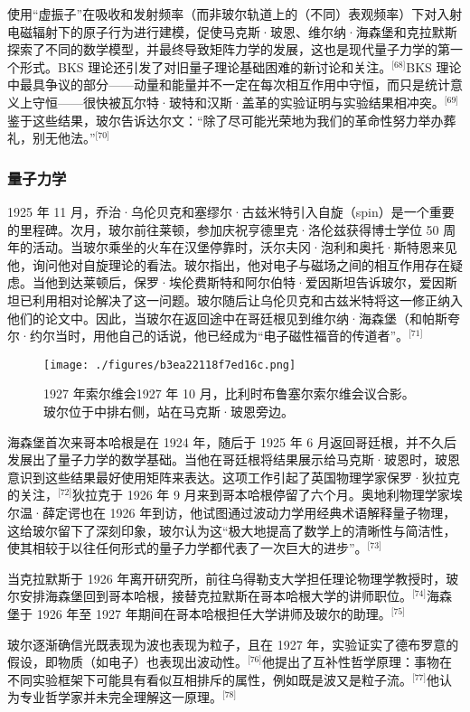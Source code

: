 使用“虚振子”在吸收和发射频率（而非玻尔轨道上的（不同）表观频率）下对入射电磁辐射下的原子行为进行建模，促使马克斯·玻恩、维尔纳·海森堡和克拉默斯探索了不同的数学模型，并最终导致矩阵力学的发展，这也是现代量子力学的第一个形式。BKS 理论还引发了对旧量子理论基础困难的新讨论和关注。\(^\text{[68]}\)BKS 理论中最具争议的部分——动量和能量并不一定在每次相互作用中守恒，而只是统计意义上守恒——很快被瓦尔特·玻特和汉斯·盖革的实验证明与实验结果相冲突。\(^\text{[69]}\)鉴于这些结果，玻尔告诉达尔文：“除了尽可能光荣地为我们的革命性努力举办葬礼，别无他法。”\(^\text{[70]}\)
\subsubsection{量子力学}
1925 年 11 月，乔治·乌伦贝克和塞缪尔·古兹米特引入自旋（spin）是一个重要的里程碑。次月，玻尔前往莱顿，参加庆祝亨德里克·洛伦兹获得博士学位 50 周年的活动。当玻尔乘坐的火车在汉堡停靠时，沃尔夫冈·泡利和奥托·斯特恩来见他，询问他对自旋理论的看法。玻尔指出，他对电子与磁场之间的相互作用存在疑虑。当他到达莱顿后，保罗·埃伦费斯特和阿尔伯特·爱因斯坦告诉玻尔，爱因斯坦已利用相对论解决了这一问题。玻尔随后让乌伦贝克和古兹米特将这一修正纳入他们的论文中。因此，当玻尔在返回途中在哥廷根见到维尔纳·海森堡（和帕斯夸尔·约尔当时，用他自己的话说，他已经成为“电子磁性福音的传道者”。\(^\text{[71]}\)
\begin{figure}[ht]
\centering
\texttt{[image: ./figures/b3ea22118f7ed16c.png]}
\caption{1927 年索尔维会1927 年 10 月，比利时布鲁塞尔索尔维会议合影。玻尔位于中排右侧，站在马克斯·玻恩旁边。} \label{fig_NRSbr_7}
\end{figure}
海森堡首次来哥本哈根是在 1924 年，随后于 1925 年 6 月返回哥廷根，并不久后发展出了量子力学的数学基础。当他在哥廷根将结果展示给马克斯·玻恩时，玻恩意识到这些结果最好使用矩阵来表达。这项工作引起了英国物理学家保罗·狄拉克的关注，\(^\text{[72]}\)狄拉克于 1926 年 9 月来到哥本哈根停留了六个月。奥地利物理学家埃尔温·薛定谔也在 1926 年到访，他试图通过波动力学用经典术语解释量子物理，这给玻尔留下了深刻印象，玻尔认为这“极大地提高了数学上的清晰性与简洁性，使其相较于以往任何形式的量子力学都代表了一次巨大的进步”。\(^\text{[73]}\)

当克拉默斯于 1926 年离开研究所，前往乌得勒支大学担任理论物理学教授时，玻尔安排海森堡回到哥本哈根，接替克拉默斯在哥本哈根大学的讲师职位。\(^\text{[74]}\)海森堡于 1926 年至 1927 年期间在哥本哈根担任大学讲师及玻尔的助理。\(^\text{[75]}\)

玻尔逐渐确信光既表现为波也表现为粒子，且在 1927 年，实验证实了德布罗意的假设，即物质（如电子）也表现出波动性。\(^\text{[76]}\)他提出了互补性哲学原理：事物在不同实验框架下可能具有看似互相排斥的属性，例如既是波又是粒子流。\(^\text{[77]}\)他认为专业哲学家并未完全理解这一原理。\(^\text{[78]}\)

